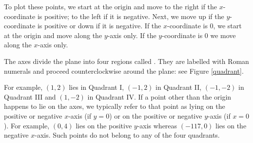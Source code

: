 
{
To plot these points, we start at the origin and move to the right if the $x$-coordinate is positive; to the left if it is negative.   Next, we move up if the $y$-coordinate is positive or down if it is negative.  If the $x$-coordinate is $0$, we start at the origin and move along the $y$-axis only.  If the  $y$-coordinate is $0$ we move along the $x$-axis only.


\begin{center}


\end{center}
}

\medskip


The axes divide the plane into four regions called  .  They are labelled with Roman numerals and proceed counterclockwise around the plane: see Figure \ref{quadrant}.



For example, $(1,2)$ lies in Quadrant I, $(-1,2)$ in Quadrant II, $(-1,-2)$ in Quadrant III and $(1,-2)$ in Quadrant IV.  If a point other than the origin happens to lie on the axes, we typically refer to that point as lying on the positive or negative $x$-axis (if $y = 0$) or on the positive or negative $y$-axis (if $x = 0$).  For example, $(0,4)$ lies on the positive $y$-axis whereas $(-117,0)$ lies on the negative $x$-axis.  Such points do not belong to any of the four quadrants.

